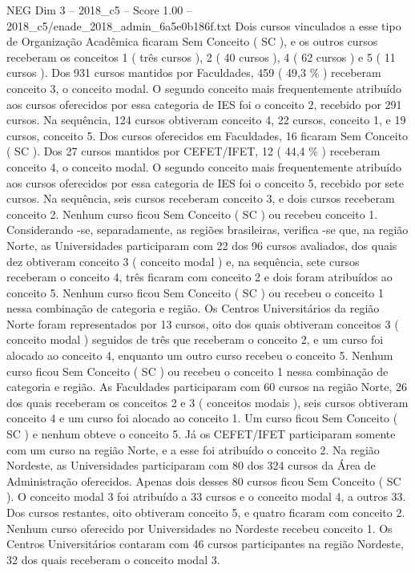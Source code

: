 \begin{textsample}{NEG Dim 3 – 2018\_c5 – Score 1.00 – 2018\_c5/enade\_2018\_admin\_6a5e0b186f.txt}
Dois cursos vinculados a esse tipo de Organização Acadêmica ficaram Sem Conceito ( SC ), e os outros cursos receberam os conceitos 1 ( três cursos ), 2 ( 40 cursos ), 4 ( 62 cursos ) e 5 ( 11 cursos ).
Dos 931 cursos mantidos por Faculdades, 459 ( 49,3 \% ) receberam conceito 3, o conceito modal.
O segundo conceito mais frequentemente atribuído aos cursos oferecidos por essa categoria de IES foi o conceito 2, recebido por 291 cursos.
Na sequência, 124 cursos obtiveram conceito 4, 22 cursos, conceito 1, e 19 cursos, conceito 5.
Dos cursos oferecidos em Faculdades, 16 ficaram Sem Conceito ( SC ).
Dos 27 cursos mantidos por CEFET/IFET, 12 ( 44,4 \% ) receberam conceito 4, o conceito modal.
O segundo conceito mais frequentemente atribuído aos cursos oferecidos por essa categoria de IES foi o conceito 5, recebido por sete cursos.
Na sequência, seis cursos receberam conceito 3, e dois cursos receberam conceito 2.
Nenhum curso ficou Sem Conceito ( SC ) ou recebeu conceito 1.
Considerando -se, separadamente, as regiões brasileiras, verifica -se que, na região Norte, as Universidades participaram com 22 dos 96 cursos avaliados, dos quais dez obtiveram conceito 3 ( conceito modal ) e, na sequência, sete cursos receberam o conceito 4, três ficaram com conceito 2 e dois foram atribuídos ao conceito 5.
Nenhum curso ficou Sem Conceito ( SC ) ou recebeu o conceito 1 nessa combinação de categoria e região.
Os Centros Universitários da região Norte foram representados por 13 cursos, oito dos quais obtiveram conceitos 3 ( conceito modal ) seguidos de três que receberam o conceito 2, e um curso foi alocado ao conceito 4, enquanto um outro curso recebeu o conceito 5.
Nenhum curso ficou Sem Conceito ( SC ) ou recebeu o conceito 1 nessa combinação de categoria e região.
As Faculdades participaram com 60 cursos na região Norte, 26 dos quais receberam os conceitos 2 e 3 ( conceitos modais ), seis cursos obtiveram conceito 4 e um curso foi alocado ao conceito 1.
Um curso ficou Sem Conceito ( SC ) e nenhum obteve o conceito 5.
Já os CEFET/IFET participaram somente com um curso na região Norte, e a esse foi atribuído o conceito 2.
Na região Nordeste, as Universidades participaram com 80 dos 324 cursos da Área de Administração oferecidos.
Apenas dois desses 80 cursos ficou Sem Conceito ( SC ).
O conceito modal 3 foi atribuído a 33 cursos e o conceito modal 4, a outros 33.
Dos cursos restantes, oito obtiveram conceito 5, e quatro ficaram com conceito 2.
Nenhum curso oferecido por Universidades no Nordeste recebeu conceito 1.
Os Centros Universitários contaram com 46 cursos participantes na região Nordeste, 32 dos quais receberam o conceito modal 3.

\end{textsample}
